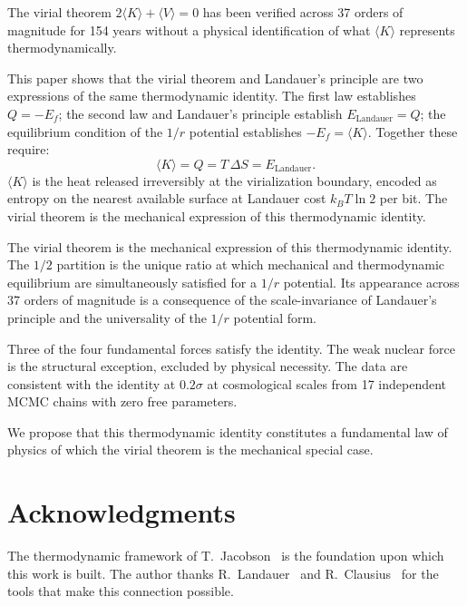 \documentclass[12pt,a4paper]{article}
\begin{document}
The virial theorem $2\langle K\rangle + \langle V\rangle = 0$ has been
verified across 37 orders of magnitude for 154 years without a physical
identification of what $\langle K\rangle$ represents thermodynamically.

This paper shows that the virial theorem and Landauer's principle are two
expressions of the same thermodynamic identity. The first law establishes
$Q = -E_f$; the second law and Landauer's principle establish
$E_\mathrm{Landauer} = Q$; the equilibrium condition of the $1/r$
potential establishes $-E_f = \langle K\rangle$. Together these require:
\begin{equation*}
\langle K\rangle = Q = T\,\Delta S = E_\mathrm{Landauer}.
\end{equation*}
$\langle K\rangle$ is the heat released irreversibly at the virialization
boundary, encoded as entropy on the nearest available surface at Landauer
cost $k_BT\ln 2$ per bit. The virial theorem is the mechanical expression
of this thermodynamic identity.

The virial theorem is the mechanical expression of this thermodynamic
identity. The $1/2$ partition is the unique ratio at which mechanical and
thermodynamic equilibrium are simultaneously satisfied for a $1/r$
potential. Its appearance across 37 orders of magnitude is a consequence
of the scale-invariance of Landauer's principle and the universality of
the $1/r$ potential form.

Three of the four fundamental forces satisfy the identity. The weak nuclear
force is the structural exception, excluded by physical necessity. The
data are consistent with the identity at $0.2\sigma$ at cosmological
scales from 17 independent MCMC chains with zero free parameters.

We propose that this thermodynamic identity constitutes a fundamental law
of physics of which the virial theorem is the mechanical special case.

\section*{Acknowledgments}

The thermodynamic framework of T.\ Jacobson~\citep{Jacobson1995} is the
foundation upon which this work is built. The author thanks
R.\ Landauer~\citep{Landauer1961} and R.\ Clausius~\citep{Clausius1870}
for the tools that make this connection possible.
\end{document}

